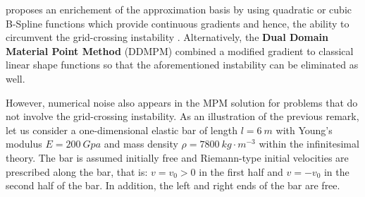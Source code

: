 proposes an enrichement of the approximation basis by using quadratic or cubic B-Spline functions which provide continuous gradients and hence, the ability to circumvent the grid-crossing instability \cite{MPM_BSpline2}. Alternatively, the \textbf{Dual Domain Material Point Method} (DDMPM) \cite{DDMPM0} combined a modified gradient to classical linear shape functions so that the aforementioned instability can be eliminated as well.


However, numerical noise also appears in the MPM solution for problems that do not involve the grid-crossing instability. As an illustration of the previous remark, let us consider a one-dimensional elastic bar of length $l=6\:m$ with Young's modulus $E=200 \:Gpa$ and mass density $\rho=7800 \:kg\cdot m^{-3}$ within the infinitesimal theory. The bar is assumed initially free and Riemann-type initial velocities are prescribed along the bar, that is: $v=v_0>0$ in the first half and $v=-v_0$ in the second half of the bar. In addition, the left and right ends of the bar are free.

